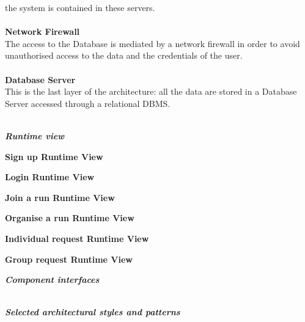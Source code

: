 \begin{legal}
the system is contained in these servers.\\\\
		\textbf{Network Firewall}\\
The access to the Database is mediated by a network firewall in order to
avoid unauthorised access to the data and the credentials of the user.\\\\
		\textbf{Database Server}\\
This is the last layer of the architecture: all the data are stored in a Database Server accessed through a relational DBMS. \\\\

		\item \textit{\textbf{Runtime view}}\\
			\begin{legal}
				\item \textbf{Sign up Runtime View}\\
				\item \textbf{Login Runtime View}\\
				\item \textbf{Join a run Runtime View}\\
				\item \textbf{Organise a run Runtime View}\\
				\item \textbf{Individual request Runtime View}\\
				\item \textbf{Group request Runtime View}\\
			\end {legal}
		\item \textit{\textbf{Component interfaces}}\\\\
		\item \textit{\textbf{Selected architectural styles and patterns}}\\\\
  	\end{legal}
